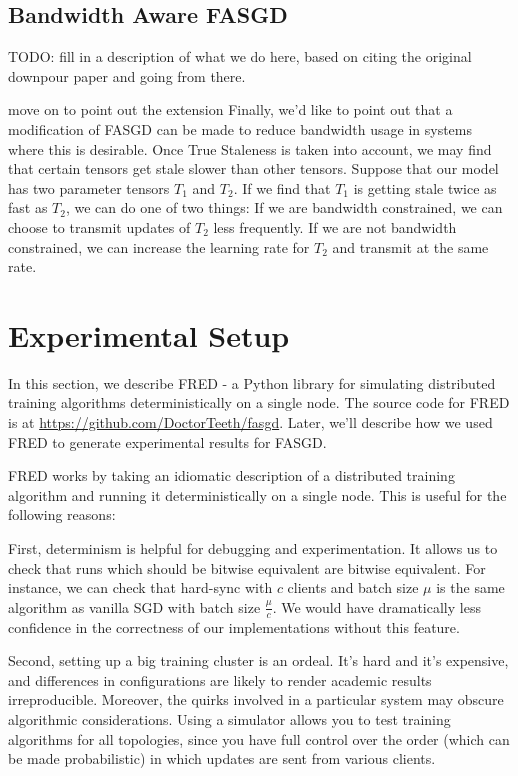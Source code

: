 \documentclass{article} %
\begin{document}
\subsection{Bandwidth Aware FASGD}

TODO: fill in a description of what we do here,
based on citing the original downpour paper and going from there.

move on to point out the extension
Finally, we'd like to point out that a modification of FASGD can be
made to reduce bandwidth usage in systems where this is desirable.
Once True Staleness is taken into account,
we may find that certain tensors get stale slower than other tensors.
Suppose that our model has two parameter tensors $T_1$ and $T_2$.
If we find that $T_1$ is getting stale twice as fast as $T_2$, we can do one of two things:
If we are bandwidth constrained, we can choose to transmit updates of $T_2$ less frequently.
If we are not bandwidth constrained, we can increase the learning rate for $T_2$ and transmit at the same rate.

\section{Experimental Setup}
\label{sec:impl}
\vspace{-0.1mm}
In this section, we describe FRED - a Python library for simulating distributed training algorithms
deterministically on a single node.
The source code for FRED is at \href{https://github.com/DoctorTeeth/fasgd}{https://github.com/DoctorTeeth/fasgd}.
Later, we'll describe how we used FRED to generate experimental results for FASGD.

FRED works by taking an idiomatic description of a distributed training algorithm and running it
deterministically on a single node. This is useful for the following reasons:

First, determinism is helpful for debugging and experimentation.
It allows us to check that runs which should be bitwise equivalent are bitwise equivalent.
For instance, we can check that hard-sync with $c$ clients and batch size $\mu$ is the same
algorithm as vanilla SGD with batch size $\frac{\mu}{c}$.
We would have dramatically less confidence in the correctness of our implementations without this feature.

Second, setting up a big training cluster is an ordeal.
It's hard and it's expensive, and differences in configurations are
likely to render academic results irreproducible.
Moreover, the quirks involved in a particular system may obscure algorithmic considerations.
Using a simulator allows you to test training algorithms for all topologies, since you
have full control over the order (which can be made probabilistic) in which updates are
sent from various clients.
\end{document}
